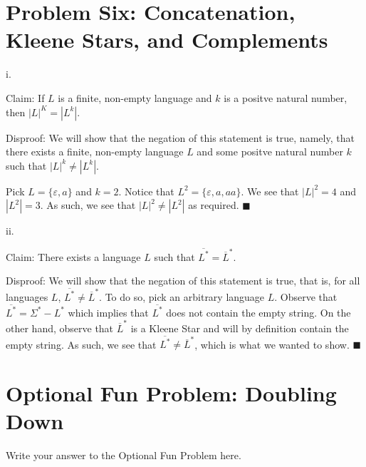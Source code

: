 \documentclass{article}
\renewcommand{\(}{\left(}
\renewcommand{\)}{\right)}
\renewcommand\qedsymbol{$\blacksquare$}
\theoremstyle{plain}
\theoremstyle{plain}
\theoremstyle{definition}
\begin{document}
\newpage

\section*{Problem Six: Concatenation, Kleene Stars, and Complements}
    i.
    \begin{shaded}
        Claim: If $L$ is a finite, non-empty language and $k$ is a positve natural number, then $|L|^{K}=|L^{k}|$.

        \vspace*{4mm}

        Disproof: We will show that the negation of this statement is true, namely, that there exists a finite, non-empty language $L$ and some positve natural number $k$ such that $|L|^{k}\neq|L^{k}|$.

        \vspace*{4mm}

        Pick $L=\{\varepsilon, a\}$ and $k=2$. Notice that $L^{2}=\{\varepsilon, a, aa\}$. We see that $|L|^{2}=4$ and $|L^{2}|=3$. As such, we see that $|L|^{2}\neq|L^{2}|$ as required. \qedsymbol
    \end{shaded}
    
    ii.
    \begin{shaded}
        Claim: There exists a language $L$ such that $\overline{L^{*}}=\overline{L}^{*}$.

        \vspace*{4mm}

        Disproof: We will show that the negation of this statement is true, that is, for all languages $L$, $\overline{L^{*}}\neq\overline{L}^{*}$. To do so, pick an arbitrary language $L$. Observe that $\overline{L^{*}}=\Sigma^{*}-L^{*}$ which implies that $\overline{L^*}$ does not contain the empty string. On the other hand, observe that $\overline{L}^{*}$ is a Kleene Star and will by definition contain the empty string. As such, we see that $\overline{L^{*}}\neq\overline{L}^{*}$, which is what we wanted to show. \qedsymbol
    \end{shaded}
    
\newpage

\section*{Optional Fun Problem: Doubling Down}
\begin{shaded}
Write your answer to the Optional Fun Problem here.
\end{shaded}
\end{document}
